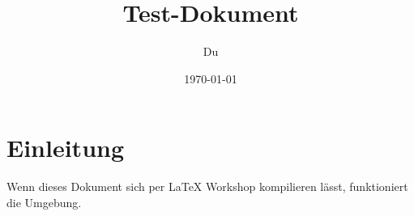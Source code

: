 \documentclass[a4paper,12pt]{article}
\title{Test-Dokument}
\author{Du}
\date{\today}
\begin{document}
\maketitle

\section{Einleitung}
Wenn dieses Dokument sich per LaTeX Workshop kompilieren lässt, funktioniert die Umgebung.
\end{document}
